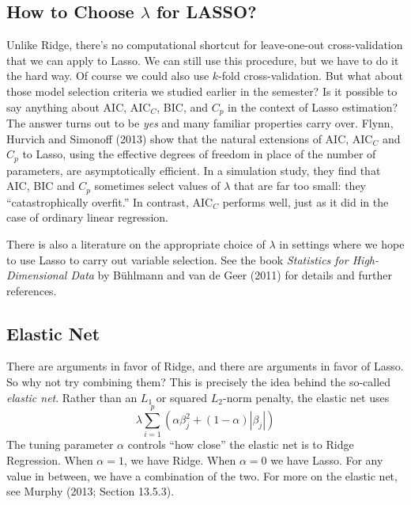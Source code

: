 \subsection{How to Choose $\lambda$ for LASSO?}
Unlike Ridge, there's no computational shortcut for leave-one-out cross-validation that we can apply to Lasso. We can still use this procedure, but we have to do it the hard way. Of course we could also use $k$-fold cross-validation. But what about those model selection criteria we studied earlier in the semester? Is it possible to say anything about AIC, AIC$_C$, BIC, and $C_p$ in the context of Lasso estimation? The answer turns out to be \emph{yes} and many familiar properties carry over. Flynn, Hurvich and Simonoff (2013) show that the natural extensions of AIC, AIC$_C$ and $C_p$ to Lasso, using the effective degrees of freedom in place of the number of parameters, are asymptotically efficient. In a simulation study, they find that AIC, BIC and $C_p$ sometimes select values of $\lambda$ that are far too small: they ``catastrophically overfit.'' In contrast, AIC$_C$ performs well, just as it did in the case of ordinary linear regression. 

There is also a literature on the appropriate choice of $\lambda$ in settings where we hope to use Lasso to carry out variable selection. See the book \emph{Statistics for High-Dimensional Data} by B\"{u}hlmann and van de Geer (2011) for details and further references.


\subsection{Elastic Net}
There are arguments in favor of Ridge, and there are arguments in favor of Lasso. So why not try combining them? This is precisely the idea behind the so-called \emph{elastic net}. Rather than an $L_1$ or squared $L_2$-norm penalty, the elastic net uses
	$$\lambda \sum_{i=1}^p \left(\alpha \beta_j^2 + (1-\alpha)|\beta_j| \right)$$
The tuning parameter $\alpha$ controls ``how close'' the elastic net is to Ridge Regression. When $\alpha = 1$, we have Ridge. When $\alpha = 0$ we have Lasso. For any value in between, we have a combination of the two. For more on the elastic net, see Murphy (2013; Section 13.5.3).



